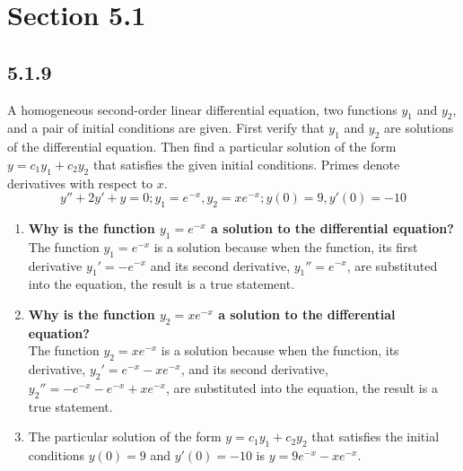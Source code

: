 \documentclass{article}
\begin{document}
\newcommand{\hr}{\par\noindent\rule{\textwidth}{0.4pt}}

\newcommand{\bc}[1]{
	\begin{equation*}
		\begin{boxed}
			{#1}
		\end{boxed}
	\end{equation*}
}

\newcommand{\cond}[2]{
	\ifmmode
		{#1} \quad {#2}
	\else
		$$ {#1} \quad {#2} $$
	\fi
}

\section{Section 5.1}

\subsection{5.1.9}
A homogeneous second-order linear differential equation, two functions $ y_1 $ and $ y_2 $, and a pair of initial conditions are given. First verify that $ y_1 $ and $ y_2 $ are solutions of the differential equation. Then find a particular solution of the form $ y = c_1y_1 + c_2y_2 $ that satisfies the given initial conditions. Primes denote derivatives with respect to $ x $.
$$ y'' + 2y' + y = 0; y_1 = e^{-x}, y_2 = xe^{-x}; y(0) = 9, y'(0) = -10 $$
\begin{enumerate}[label=\textbf{(\alph*)}]
	\item \textbf{Why is the function $ y_1 = e^{-x} $ a solution to the differential equation?} \\
		The function $ y_1 = e^{-x} $ is a solution because when the function, its first derivative $ y_1' = -e^{-x} $ and its second derivative, $ y_1'' = e^{-x} $, are substituted into the equation, the result is a true statement.
	\item \textbf{Why is the function $ y_2 = xe^{-x} $ a solution to the differential equation?} \\
		The function $ y_2 = xe^{-x} $ is a solution because when the function, its derivative, $ y_2' = e^{-x} - xe^{-x} $, and its second derivative, $ y_2'' = -e^{-x} - e^{-x} + xe^{-x} $, are substituted into the equation, the result is a true statement.
	\item The particular solution of the form $ y = c_1y_1 + c_2y_2 $ that satisfies the initial conditions $ y(0) = 9 $ and $ y'(0) = -10 $ is $ y = 9e^{-x} - xe^{-x} $.
\end{enumerate}
\end{document}
